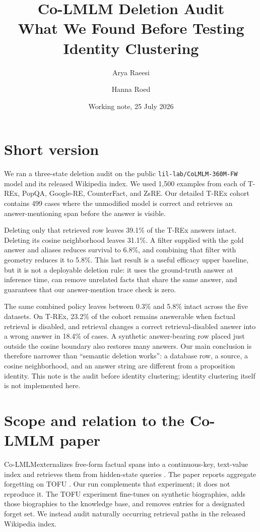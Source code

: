 \documentclass[11pt]{article}
\title{\textbf{Co-LMLM Deletion Audit}\\
\large What We Found Before Testing Identity Clustering}
\author{Arya Raeesi \and Hanna Roed}
\date{Working note, 25 July 2026}
\newcommand{\colmlm}{Co-LMLM}
\newcommand{\pct}[1]{#1\%}
\begin{document}
\maketitle

\section*{Short version}

We ran a three-state deletion audit on the public
\texttt{lil-lab/CoLMLM-360M-FW} model and its released Wikipedia index. We
used 1,500 examples from each of T-REx, PopQA, Google-RE, CounterFact, and
ZsRE. Our detailed T-REx cohort contains 499 cases where the unmodified model
is correct and retrieves an answer-mentioning span before the answer is
visible.

Deleting only that retrieved row leaves \pct{39.1} of the T-REx answers
intact. Deleting its cosine neighborhood leaves \pct{31.1}. A filter supplied
with the gold answer and aliases reduces survival to \pct{6.8}, and combining
that filter with geometry reduces it to \pct{5.8}. This last result is a useful
efficacy upper baseline, but it is not a deployable deletion rule: it uses the
ground-truth answer at inference time, can remove unrelated facts that share
the same answer, and guarantees that our answer-mention trace check is zero.

The same combined policy leaves between \pct{0.3} and \pct{5.8} intact across
the five datasets. On T-REx, \pct{23.2} of the cohort remains answerable when
factual retrieval is disabled, and retrieval changes a correct
retrieval-disabled answer into a wrong answer in \pct{18.4} of cases. A
synthetic answer-bearing row placed just outside the cosine boundary also
restores many answers. Our main conclusion is therefore narrower than
``semantic deletion works'': a database row, a source, a cosine neighborhood,
and an answer string are different from a proposition identity. This note is
the audit before identity clustering; identity clustering itself is not
implemented here.

\section{Scope and relation to the Co-LMLM paper}

\colmlm externalizes free-form factual spans into a continuous-key,
text-value index and retrieves them from hidden-state queries
\cite{feldman2026colmlm}. The paper reports aggregate forgetting on TOFU
\cite{maini2024tofu}. Our run complements that experiment; it does not
reproduce it. The TOFU experiment fine-tunes on synthetic biographies, adds
those biographies to the knowledge base, and removes entries for a designated
forget set. We instead audit naturally occurring retrieval paths in the
released Wikipedia index.
\end{document}
